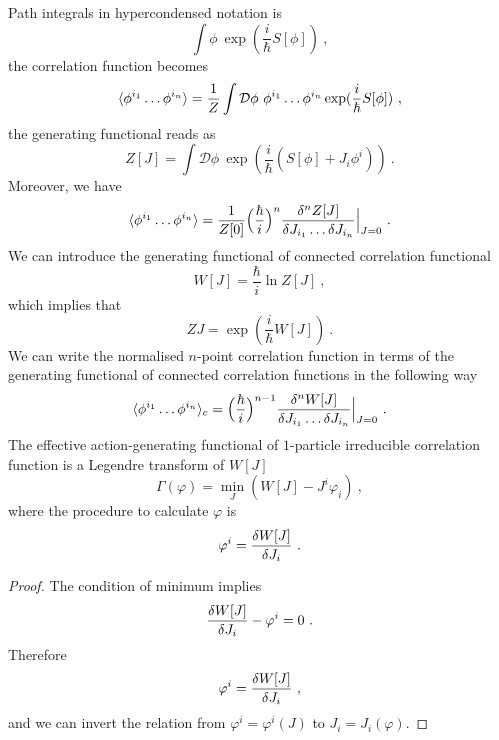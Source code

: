     Path integrals in hypercondensed notation is 
    \begin{equation*}
        \int \mathcal \phi ~ \exp(\frac{i}{\hbar} S[\phi]) ~,
    \end{equation*}
    the correlation function becomes 
    \begin{equation*}
        \langle\phi^{i_1} \ldots \phi^{i_n}\rangle = \frac{1}{Z} \int \mathcal D \phi ~ \phi^{i_1} \ldots \phi^{i_n} \exp( \frac{i}{\hbar} S[\phi]) ~,
    \end{equation*}
    the generating functional reads as
    \begin{equation*}
        Z[J] = \int \mathcal D \phi ~ \exp(\frac{i}{\hbar} (S[\phi] + J_i \phi^i)) ~.
    \end{equation*}
    Moreover, we have 
    \begin{equation*}
        \langle\phi^{i_1} \ldots \phi^{i_n}\rangle = \frac{1}{Z[0]} \Big ( \frac{\hbar}{i} \Big)^n \frac{\delta^n Z[J]}{\delta J_{i_1} \ldots \delta J_{i_n}} \Big \vert_{J=0} ~.
    \end{equation*}
    We can introduce the generating functional of connected correlation functional 
    \begin{equation*}
        W[J] = \frac{\hbar}{i} \ln Z[J] ~,
    \end{equation*}
    which implies that 
    \begin{equation*}
        Z{J} = \exp (\frac{i}{\hbar} W[J]) ~.
    \end{equation*}
    We can write the normalised $n$-point correlation function in terms of the generating functional of connected correlation functions in the following way 
    \begin{equation*}
        \langle\phi^{i_1} \ldots \phi^{i_n}\rangle_c = \Big ( \frac{\hbar}{i} \Big)^{n-1} \frac{\delta^n W[J]}{\delta J_{i_1} \ldots \delta J_{i_n}} \Big \vert_{J=0} ~.
    \end{equation*}
    The effective action-generating functional of $1$-particle irreducible correlation function is a Legendre transform of $W[J]$
    \begin{equation*}
        \Gamma (\varphi) = \min_J (W[J] - J^i \varphi_i) ~,
    \end{equation*}
    where the procedure to calculate $\varphi$ is 
    \begin{equation*}
        \varphi^i = \frac{\delta W[J]}{\delta J_i} ~.
    \end{equation*}
    \begin{proof}
        The condition of minimum implies 
        \begin{equation*}
            \frac{\delta W[J]}{\delta J_i} -  \varphi^i = 0 ~.
        \end{equation*}
        Therefore 
        \begin{equation*}
            \varphi^i = \frac{\delta W[J]}{\delta J_i} ~,
        \end{equation*}
        and we can invert the relation from $\varphi^i = \varphi^i (J)$ to $J_i = J_i(\varphi)$.
    \end{proof}

